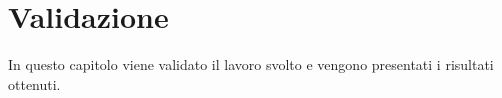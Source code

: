 \chapter{Validazione}
In questo capitolo viene validato il lavoro svolto e vengono presentati i risultati ottenuti.

